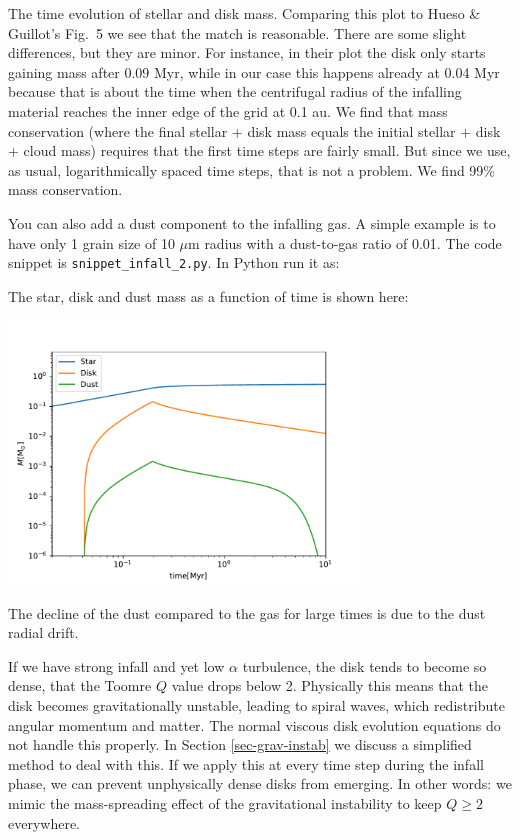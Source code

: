 \documentclass{book}
\newcommand{\code}[1]{{\small\tt #1}}
\begin{document}
The time evolution of stellar and disk mass. Comparing this plot to Hueso \&
Guillot's Fig.\ 5 we see that the match is reasonable. There are some slight
differences, but they are minor. For instance, in their plot the disk only
starts gaining mass after 0.09 Myr, while in our case this happens already at
0.04 Myr because that is about the time when the centrifugal radius of the
infalling material reaches the inner edge of the grid at 0.1 au.  We find that
mass conservation (where the final stellar + disk mass equals the initial
stellar + disk + cloud mass) requires that the first time steps are fairly
small. But since we use, as usual, logarithmically spaced time steps, that is
not a problem. We find 99\% mass conservation.

You can also add a dust component to the infalling gas. A simple example is
to have only 1 grain size of 10 $\mu$m radius with a dust-to-gas ratio of 0.01.
The code snippet is
\code{snippet\_infall\_2.py}. In Python run it as:
\begin{codebox}
\end{codebox}
The star, disk and dust mass as a function of time is shown here:\\
\centerline{\includegraphics[width=0.7\textwidth]{../snippets/fig_snippet_infall_2_1.pdf}}
The decline of the dust compared to the gas for large times is due to the
dust radial drift.

If we have strong infall and yet low $\alpha$ turbulence, the disk tends to
become so dense, that the Toomre $Q$ value drops below 2. Physically this means
that the disk becomes gravitationally unstable, leading to spiral waves, which
redistribute angular momentum and matter. The normal viscous disk evolution
equations do not handle this properly. In Section \ref{sec-grav-instab} we
discuss a simplified method to deal with this. If we apply this at every time
step during the infall phase, we can prevent unphysically dense disks from
emerging. In other words: we mimic the mass-spreading effect of the
gravitational instability to keep $Q\ge 2$ everywhere.
\end{document}
